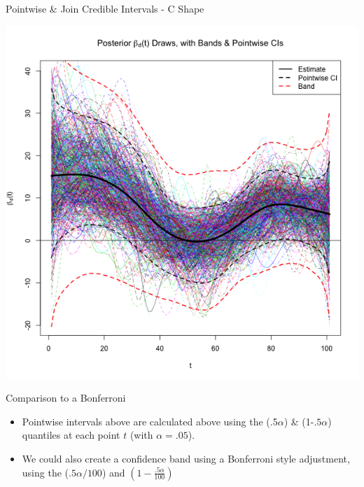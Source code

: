 \documentclass[9 pt]{beamer}
\newcommand{\bi}{\begin{itemize}}
\newcommand{\ei}{\end{itemize}}
\newcommand{\ilist}[1]{\bi \item #1 \ei}
\begin{document}
\begin{frame}{Pointwise \& Join Credible Intervals  - C Shape}

\begin{center}

\includegraphics[scale=.37]{pics/Figure_Bands_C_Shape_12-19-12_Nobonf.png}

\end{center}
\end{frame}



\begin{frame}{Comparison to a Bonferroni}

\bi
\item  Pointwise intervals above are calculated above using the (.5$\alpha$) \& (1-$.5\alpha$) quantiles at each point $t$ (with $\alpha= .05$).
\item We could also create a confidence band using a Bonferroni style adjustment, using the ($.5\alpha/100$) and $(1- \frac{.5\alpha}{ 100})$
\ei



\end{frame}
\end{document}
